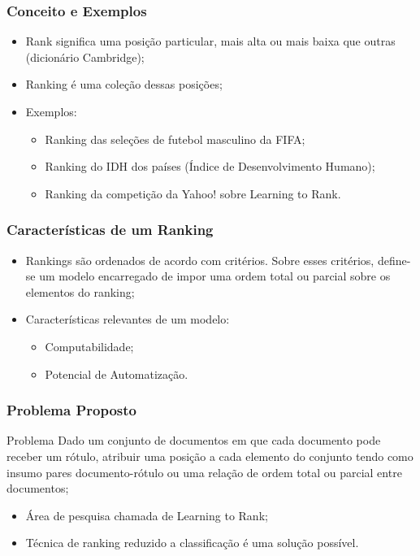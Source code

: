 \begin{frame}
    \frametitle{Conceito e Exemplos}

    \begin{itemize}
        \item Rank significa uma posição particular, mais alta ou mais baixa que outras (dicionário Cambridge);
    
        \item Ranking é uma coleção dessas posições;
    
        \item Exemplos:

        \begin{itemize}
            \item Ranking das seleções de futebol masculino da FIFA;
            \item Ranking do IDH dos países (Índice de Desenvolvimento Humano);
            \item Ranking da competição da Yahoo! sobre Learning to Rank.
        \end{itemize}
    \end{itemize}
\end{frame}

\begin{frame}
    \frametitle{Características de um Ranking}

    \begin{itemize}
        \item Rankings são ordenados de acordo com critérios. Sobre esses critérios, define-se um modelo encarregado de impor uma ordem total ou parcial sobre os elementos do ranking;

        \item Características relevantes de um modelo:

        \begin{itemize}
            \item Computabilidade;
            \item Potencial de Automatização.
        \end{itemize}
    \end{itemize}
\end{frame}

\begin{frame}
    \frametitle{Problema Proposto}

    \begin{block}{Problema}
        Dado um conjunto de documentos em que cada documento pode receber um rótulo, atribuir uma posição a cada elemento do conjunto tendo como insumo pares documento-rótulo ou uma relação de ordem total ou parcial entre documentos;
    \end{block}

    \begin{itemize}
        \item Área de pesquisa chamada de Learning to Rank;
        \item Técnica de ranking reduzido a classificação é uma solução possível.
    \end{itemize}
\end{frame}
